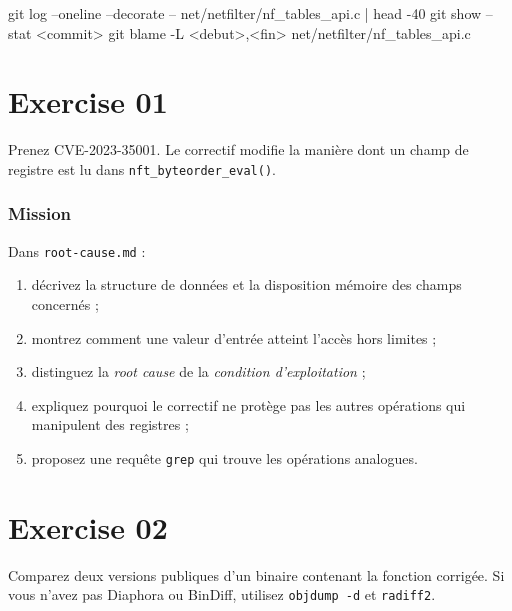 \documentclass{training}
\begin{document}
\begin{console}
git log --oneline --decorate -- net/netfilter/nf_tables_api.c | head -40
git show --stat <commit>
git blame -L <debut>,<fin> net/netfilter/nf_tables_api.c
\end{console}

\chapter{Exercise 01}
\makeheaderfiles

Prenez CVE-2023-35001. Le correctif modifie la manière dont un champ de
registre est lu dans \texttt{nft\_byteorder\_eval()}.

\subsection*{Mission}

Dans \texttt{root-cause.md} :

\begin{enumerate}
  \item décrivez la structure de données et la disposition mémoire des
        champs concernés ;
  \item montrez comment une valeur d'entrée atteint l'accès hors limites ;
  \item distinguez la \emph{root cause} de la \emph{condition
        d'exploitation} ;
  \item expliquez pourquoi le correctif ne protège pas les autres
        opérations qui manipulent des registres ;
  \item proposez une requête \texttt{grep} qui trouve les opérations
        analogues.
\end{enumerate}


\chapter{Exercise 02}
\makeheaderfiles

Comparez deux versions publiques d'un binaire contenant la fonction
corrigée. Si vous n'avez pas Diaphora ou BinDiff, utilisez
\texttt{objdump -d} et \texttt{radiff2}.
\end{document}
